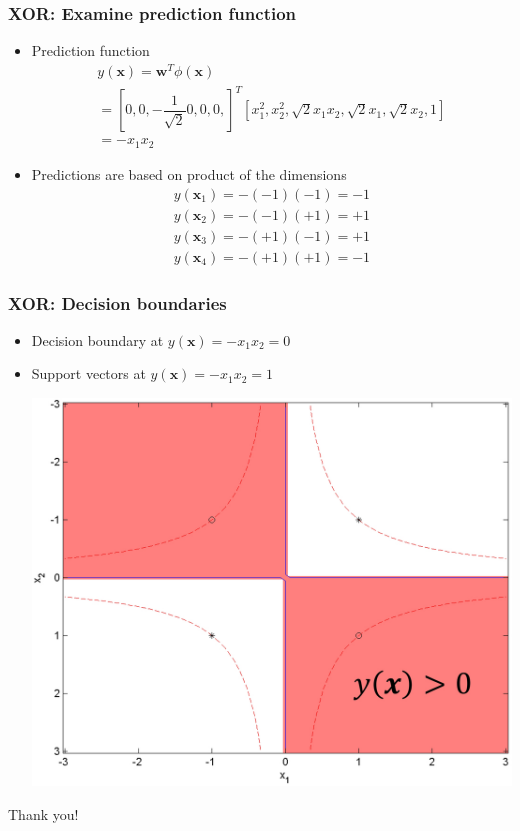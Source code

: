 \documentclass[12pt,notes,mathserif]{beamer}
\newcommand{\chuhao}{\fontsize{44.9pt}{\baselineskip}\selectfont}
\begin{document}
\begin{frame}[c]
\frametitle{XOR: Examine prediction function}
\begin{itemize}
\item Prediction function
\begin{gather*}
y(\mathbf{x})=\mathbf{w}^T\phi(\mathbf{x})\\
=\left[
0,
0,
-\dfrac1{\sqrt2}
0,
0,
0,\right]^T\left[
x_1^2,
x_2^2,
\sqrt2x_1x_2,
\sqrt2x_1,
\sqrt2x_2,
1\right]\\
=-x_1x_2
\end{gather*}

\item Predictions are based on product of the dimensions
\begin{gather*}
y(\mathbf{x}_1)=-(-1)(-1)=-1\\
y(\mathbf{x}_2)=-(-1)(+1)=+1\\
y(\mathbf{x}_3)=-(+1)(-1)=+1\\
y(\mathbf{x}_4)=-(+1)(+1)=-1
\end{gather*}
\end{itemize}
\end{frame}



\begin{frame}[c]
\frametitle{XOR: Decision boundaries}
\begin{itemize}
\item Decision boundary at $y(\mathbf{x})=-x_1x_2 = 0$
\item Support vectors at $y(\mathbf{x})=-x_1x_2 = 1$
\begin{center}
\includegraphics[width=0.7\linewidth]{fig10/lec1019.jpg}
\end{center}
\end{itemize}
\end{frame}




\begin{frame}
\begin{center}
\chuhao Thank you! %
\end{center}
\end{frame}
\end{document}
